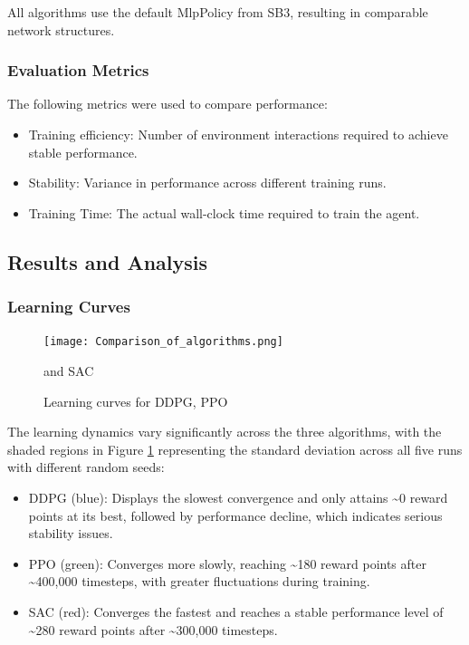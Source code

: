 All algorithms use the default MlpPolicy from \gls{SB3}, resulting in comparable network structures.

\subsubsection{Evaluation Metrics}

The following metrics were used to compare performance:

\begin{itemize}
    \item Training efficiency: Number of environment interactions required to achieve stable performance.
    \item Stability: Variance in performance across different training runs.
    \item Training Time: The actual wall-clock time required to train the agent.
\end{itemize}

\subsection{Results and Analysis}

\subsubsection{Learning Curves}

\begin{figure}[h] %
    \centering
    \texttt{[image: Comparison\_of\_algorithms.png]} %
    \caption{Learning curves for \gls{DDPG}, \gls{PPO}} and \gls{SAC}
    \label{fig:algo_comperison}
\end{figure}

\noindent The learning dynamics vary significantly across the three algorithms, with the shaded regions in Figure \ref{fig:algo_comperison} representing the standard deviation across all five runs with different random seeds:

\begin{itemize}
    \item \gls{DDPG} (blue): Displays the slowest convergence and only attains \textasciitilde0 reward points at its best, followed by performance decline, which indicates serious stability issues.
    \item \gls{PPO} (green): Converges more slowly, reaching \textasciitilde180 reward points after \textasciitilde400,000 timesteps, with greater fluctuations during training.
    \item \gls{SAC} (red): Converges the fastest and reaches a stable performance level of \textasciitilde280 reward points after \textasciitilde300,000 timesteps.
\end{itemize}

